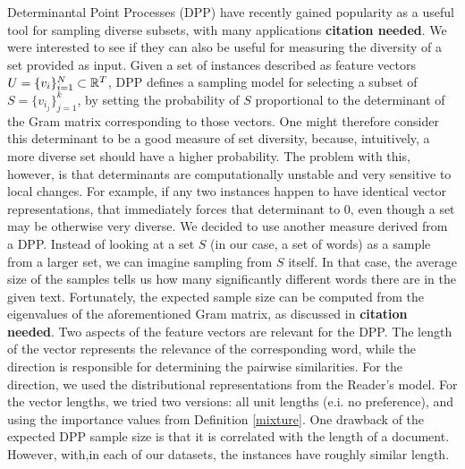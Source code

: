 Determinantal Point Processes (DPP) have recently gained popularity as a
useful tool for sampling diverse subsets, with many applications {\bf citation
  needed}. We were interested to see if they can also be useful for
measuring the diversity of a set provided as input. Given a set of
instances described as feature vectors $U=\{v_i\}_{i=1}^N\subset {\mathbb R}^T$, DPP defines a
sampling model for selecting a subset of $S=\{v_{i_j}\}_{j=1}^k$, by
setting the probability of $S$ proportional to the determinant of the
Gram matrix corresponding to those vectors. One might therefore
consider this determinant to be a good measure of set diversity,
because, intuitively, a more diverse set should have a higher
probability. The problem with this, however, is that determinants are
computationally unstable and very sensitive to local changes. For
example, if any two instances happen to have identical vector
representations, that immediately forces that determinant to $0$, even
though a set may be otherwise very diverse. We decided to use
another measure derived from a DPP. Instead of looking at a set $S$
(in our case, a set of words) as a sample from a larger set, we can
imagine sampling from $S$ itself. In that case, the average size of
the samples tells us how many significantly different words there are
in the given text. Fortunately, the expected sample size can be
computed from the eigenvalues of the aforementioned Gram matrix, as
discussed in {\bf citation needed}. Two aspects of the feature
vectors are relevant for the DPP. The length of the vector represents
the relevance of the corresponding word, while the direction is
responsible for determining the pairwise similarities. For the
direction, we used the distributional representations from the
Reader's model. For the vector lengths, we tried two versions: all
unit lengths (e.i. no preference), and using the importance values from
Definition \ref{mixture}. One drawback of the expected
DPP sample size is that it is correlated with the length of a
document. However, with,in each of our datasets, the instances have roughly
similar length.

